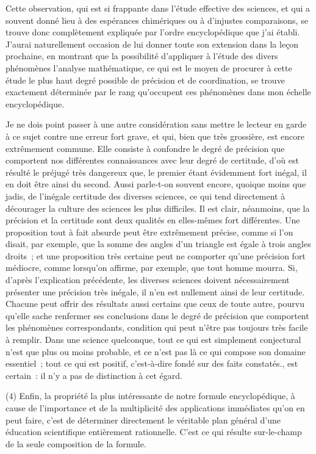 \documentclass[french,twoside]{book} %
\begin{document}
Cette observation, qui est si frappante dans l’étude effective des sciences, et qui a souvent donné lieu à des espérances chimériques ou à d’injustes comparaisons, se trouve donc complètement expliquée par l’ordre encyclopédique que j’ai établi. J’aurai naturellement occasion de lui donner toute son extension dans la leçon prochaine, en montrant que la possibilité d’appliquer à l’étude des divers phénomènes l’analyse mathématique, ce qui est le moyen de procurer à cette étude le plus haut degré possible de précision et de coordination, se trouve exactement déterminée par le rang qu’occupent ces phénomènes dans mon échelle encyclopédique.\par
Je ne dois point passer à une autre considération sans mettre le lecteur en garde à ce sujet contre une erreur fort grave, et qui, bien que très grossière, est encore extrêmement commune. Elle consiste à confondre le degré de précision que comportent nos différentes connaissances avec leur degré de certitude, d’où est résulté le préjugé très dangereux que, le premier étant évidemment fort inégal, il en doit être ainsi du second. Aussi parle-t-on souvent encore, quoique moins que jadis, de l’inégale certitude des diverses sciences, ce qui tend directement à décourager la culture des sciences les plus difficiles. Il est clair, néanmoins, que la précision et la certitude sont deux qualités en elles-mêmes fort différentes. Une proposition tout à fait absurde peut être extrêmement précise, comme si l’on disait, par exemple, que la somme des angles d’un triangle est égale à trois angles droits ; et une proposition très certaine peut ne comporter qu’une précision fort médiocre, comme lorsqu’on affirme, par exemple, que tout homme mourra. Si, d’après l’explication précédente, les diverses sciences doivent nécessairement présenter une précision très inégale, il n’en est nullement ainsi de leur certitude. Chacune peut offrir des résultats aussi certains que ceux de toute autre, pourvu qu’elle sache renfermer ses conclusions dans le degré de précision que comportent les phénomènes correspondants, condition qui peut n’être pas toujours très facile à remplir. Dans une science quelconque, tout ce qui est simplement conjectural n’est que plus ou moins probable, et ce n’est pas là ce qui compose son domaine essentiel ; tout ce qui est positif, c’est-à-dire fondé sur des faits constatés., est certain : il n’y a pas de distinction à cet égard.\par
(4) Enfin, la propriété la plus intéressante de notre formule encyclopédique, à cause de l’importance et de la multiplicité des applications immédiates qu’on en peut faire, c’est de déterminer directement le véritable plan général d’une éducation scientifique entièrement rationnelle. C’est ce qui résulte sur-le-champ de la seule composition de la formule.\par
\end{document}
